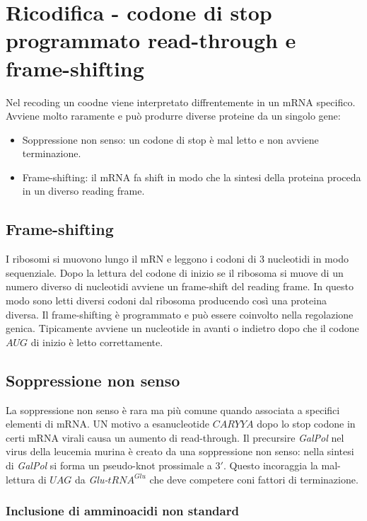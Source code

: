 \section{Ricodifica - codone di stop programmato read-through e frame-shifting}
Nel recoding un coodne viene interpretato diffrentemente in un mRNA specifico. Avviene molto raramente e pu\`o produrre diverse proteine da un singolo gene:
\begin{itemize}
	\item Soppressione non senso: un codone di stop \`e mal letto e non avviene terminazione.
	\item Frame-shifting: il mRNA fa shift in modo che la sintesi della proteina proceda in un diverso reading frame. 
\end{itemize}
\subsection{Frame-shifting}
I ribosomi si muovono lungo il mRN e leggono i codoni di $3$ nucleotidi in modo sequenziale. Dopo la lettura del codone di inizio se il ribosoma si muove di un numero diverso di 
nucleotidi avviene un frame-shift del reading frame. In questo modo sono letti diversi codoni dal ribosoma producendo cos\`i una proteina diversa. Il frame-shifting \`e programmato
e pu\`o essere coinvolto nella regolazione genica. Tipicamente avviene un nucleotide in avanti o indietro dopo che il codone $AUG$ di inizio \`e letto correttamente.
\subsection{Soppressione non senso}
La soppressione non senso \`e rara ma pi\`u comune quando associata a specifici elementi di mRNA. UN motivo a esanucleotide $CARYYA$ dopo lo stop codone in certi mRNA virali causa
un aumento di read-through. Il precursire \emph{GalPol} nel virus della leucemia murina \`e creato da una soppressione non senso: nella sintesi di \emph{GalPol} si forma un 
pseudo-knot prossimale a $3'$. Questo incoraggia la mal-lettura di $UAG$ da \emph{Glu-$tRNA^{Glu}$} che deve competere coni fattori di terminazione. 
\subsubsection{Inclusione di amminoacidi non standard}
